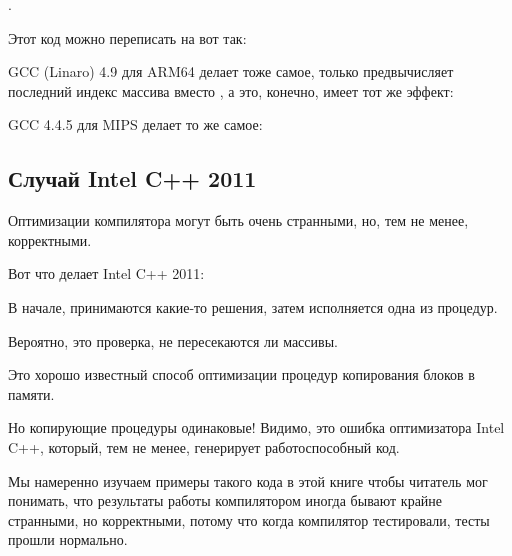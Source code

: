 .

Этот код можно переписать на \CCpp вот так:



GCC (Linaro) 4.9 для ARM64 делает тоже самое, только предвычисляет последний индекс массива  вместо
, а это, конечно, имеет тот же эффект:




GCC 4.4.5 для MIPS делает то же самое:



\subsection{Случай Intel C++ 2011}
\myindex{\CompilerAnomaly}
\label{loops_iterators_loop_anomaly}

Оптимизации компилятора могут быть очень странными, но, тем не менее, корректными.

Вот что делает Intel C++ 2011:



В начале, принимаются какие-то решения, затем исполняется одна из процедур.

Вероятно, это проверка, не пересекаются ли массивы.

Это хорошо известный способ оптимизации процедур копирования блоков в памяти.

Но копирующие процедуры одинаковые!
Видимо, это ошибка оптимизатора Intel C++, который, тем не менее, генерирует работоспособный код.

Мы намеренно изучаем примеры такого кода в этой книге чтобы читатель мог понимать, что результаты работы
компилятором иногда бывают крайне странными, но корректными, потому что когда компилятор тестировали, 
тесты прошли нормально.%

